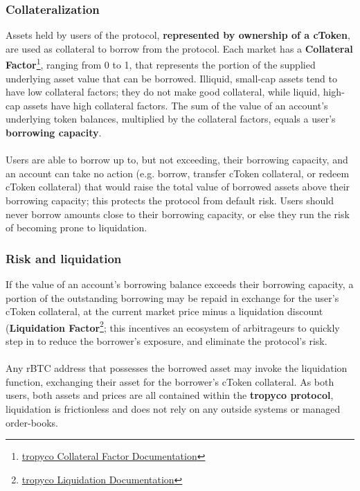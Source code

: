 \documentclass{article}
\begin{document}
\subsubsection{Collateralization}
Assets held by users of the protocol, \textbf{represented by ownership of a cToken}, are used as collateral to borrow from the protocol. Each market has a \textbf{Collateral Factor}\footnote{\href{https://test.tropyco.app/docs/keyConcepts\#ctokens}{tropyco Collateral Factor Documentation}}, ranging from 0 to 1, that represents the portion of the supplied underlying asset value that can be borrowed. Illiquid, small-cap assets tend to have low collateral factors; they do not make good collateral, while liquid, high-cap assets have high collateral factors. The sum of the value of an account's underlying token balances, multiplied by the collateral factors, equals a user's \textbf{borrowing capacity}.
\\
\\
Users are able to borrow up to, but not exceeding, their borrowing capacity, and an account can
take no action (e.g. borrow, transfer cToken collateral, or redeem cToken collateral) that would
raise the total value of borrowed assets above their borrowing capacity; this protects the protocol
from default risk. Users should never borrow amounts close to their borrowing capacity, or else they run the risk of becoming prone to liquidation.

\subsubsection{Risk and liquidation}
If the value of an account's borrowing balance exceeds their borrowing capacity, a portion of
the outstanding borrowing may be repaid in exchange for the user's cToken collateral, at the current market price minus a liquidation discount (\textbf{Liquidation Factor}\footnote{\href{https://test.tropyco.app/docs/keyConcepts\#liquidation}{tropyco Liquidation Documentation}}; this incentives an ecosystem of arbitrageurs to quickly step in to reduce the borrower's exposure, and eliminate the protocol's risk.
\\ \\
Any rBTC address that possesses the borrowed asset may invoke the liquidation function, exchanging their asset for the borrower's cToken collateral. As both users, both assets and prices
are all contained within the \textbf{tropyco protocol}, liquidation is frictionless and does not rely on any outside systems or managed order-books.
\end{document}
